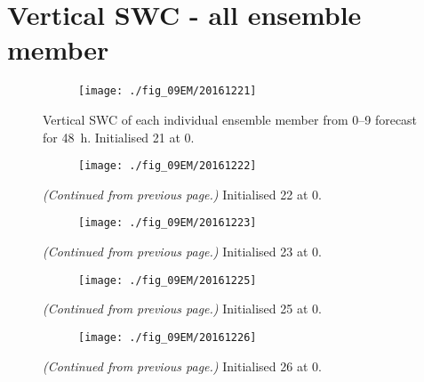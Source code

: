 
\section{Vertical SWC - all ensemble member}%
\label{app:vert_ensmemb09}

\begin{figure}[h]%
	\centering
	\begin{subfigure}[t]{\textwidth} 
		\centering
		\texttt{[image: ./fig\_09EM/20161221]}
		\caption{}\label{fig:EM09_21}
	\end{subfigure}
    \caption{Vertical SWC of each individual ensemble member from \numrange{0}{9} forecast for \SI{48}{\hour}. Initialised \SI{21}{\dec} at \SI{0}{\UTC}.}\label{fig:EM09}
\end{figure}
\begin{figure}[h]\ContinuedFloat
	\centering
	\begin{subfigure}[t]{\textwidth} 
		\centering
		\texttt{[image: ./fig\_09EM/20161222]}
		\caption{}\label{fig:EM09_22}
	\end{subfigure}
    \caption{\textit{(Continued from previous page.)} Initialised \SI{22}{\dec} at \SI{0}{\UTC}. } 
\end{figure}
\begin{figure}\ContinuedFloat
	\centering
	\begin{subfigure}[t]{\textwidth} 
		\centering
		\texttt{[image: ./fig\_09EM/20161223]}
		\caption{}\label{fig:EM09_23}
	\end{subfigure}
    \caption{\textit{(Continued from previous page.)} Initialised \SI{23}{\dec} at \SI{0}{\UTC}. } 
\end{figure}
\begin{figure}\ContinuedFloat
	\centering
			\begin{subfigure}[t]{\textwidth}
            \centering
            \texttt{[image: ./fig\_09EM/20161225]}
				\caption{}\label{fig:EM09_25}
			\end{subfigure}
    \caption{\textit{(Continued from previous page.)} Initialised \SI{25}{\dec} at \SI{0}{\UTC}. }        
\end{figure}
\begin{figure}[t]\ContinuedFloat
	\centering
	\begin{subfigure}[t]{\textwidth}	
		\centering
		\texttt{[image: ./fig\_09EM/20161226]}
		\caption{}\label{fig:EM09_26}
	\end{subfigure}
	\caption{\textit{(Continued from previous page.)} Initialised \SI{26}{\dec} at \SI{0}{\UTC}.}
\end{figure}

